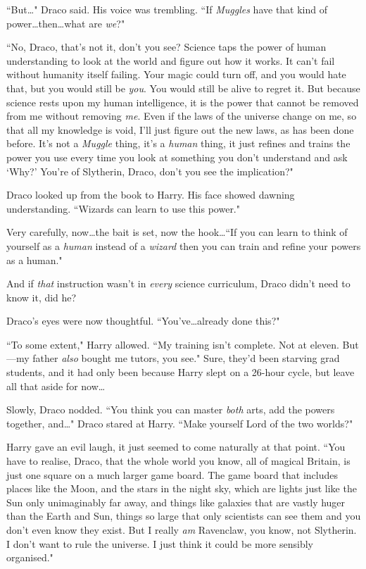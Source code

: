 ``But…" Draco said. His voice was trembling. ``If \emph{Muggles} have that kind of power…then…what are \emph{we}?"

``No, Draco, that's not it, don't you see? Science taps the power of human understanding to look at the world and figure out how it works. It can't fail without humanity itself failing. Your magic could turn off, and you would hate that, but you would still be \emph{you}. You would still be alive to regret it. But because science rests upon my human intelligence, it is the power that cannot be removed from me without removing \emph{me}. Even if the laws of the universe change on me, so that all my knowledge is void, I'll just figure out the new laws, as has been done before. It's not a \emph{Muggle} thing, it's a \emph{human} thing, it just refines and trains the power you use every time you look at something you don't understand and ask `Why?' You're of Slytherin, Draco, don't you see the implication?"

Draco looked up from the book to Harry. His face showed dawning understanding. ``Wizards can learn to use this power."

Very carefully, now…the bait is set, now the hook…``If you can learn to think of yourself as a \emph{human} instead of a \emph{wizard} then you can train and refine your powers as a human."

And if \emph{that} instruction wasn't in \emph{every} science curriculum, Draco didn't need to know it, did he?

Draco's eyes were now thoughtful. ``You've…already done this?"

``To some extent," Harry allowed. ``My training isn't complete. Not at eleven. But—my father \emph{also} bought me tutors, you see." Sure, they'd been starving grad students, and it had only been because Harry slept on a 26-hour cycle, but leave all that aside for now…

Slowly, Draco nodded. ``You think you can master \emph{both} arts, add the powers together, and…" Draco stared at Harry. ``Make yourself Lord of the two worlds?"

Harry gave an evil laugh, it just seemed to come naturally at that point. ``You have to realise, Draco, that the whole world you know, all of magical Britain, is just one square on a much larger game board. The game board that includes places like the Moon, and the stars in the night sky, which are lights just like the Sun only unimaginably far away, and things like galaxies that are vastly huger than the Earth and Sun, things so large that only scientists can see them and you don't even know they exist. But I really \emph{am} Ravenclaw, you know, not Slytherin. I don't want to rule the universe. I just think it could be more sensibly organised."

